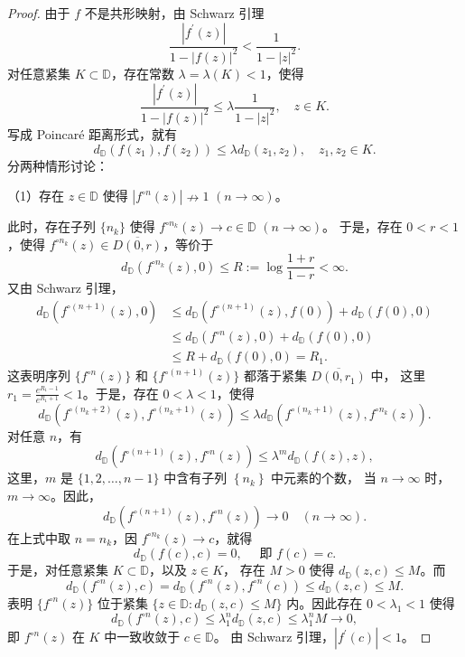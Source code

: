 \begin{proof}
由于 $f$ 不是共形映射，由 Schwarz 引理
$$\frac{|f^{\prime}(z)|}{1-|f(z)|^2}<\frac{1}{1-|z|^2}.$$
对任意紧集 $K \subset \mathbb{D}$，存在常数 $\lambda=\lambda(K)<1$，使得
$$\frac{|f^{\prime}(z)|}{1-|f(z)|^2} \leq \lambda \frac{1}{1-|z|^2}, \quad z \in K.$$
写成 Poincaré 距离形式，就有
$$d_{\mathbb{D}}(f(z_1), f(z_2)) \leq \lambda d_{\mathbb{D}}(z_1, z_2), \quad z_1, z_2 \in K.$$
分两种情形讨论：

（1）存在 $z \in \mathbb{D}$ 使得 $|f^{\circ n}(z)| \nrightarrow 1$ $(n \rightarrow \infty)$。

此时，存在子列 $\{n_k\}$ 使得 $f^{\circ n_k}(z) \rightarrow c \in \mathbb{D}$ $(n \rightarrow \infty)$。
于是，存在 $0<r<1$，使得 $f^{\circ n_k}(z) \in \overline{D(0, r)}$，等价于
\[d_{\mathbb{D}}\left(f^{\circ n_k}(z), 0\right) \leq R:=\log \frac{1+r}{1-r}<\infty.\]
又由 Schwarz 引理，
\begin{align*}
d_{\mathbb{D}}(f^{\circ(n+1)}(z), 0) & \leq d_{\mathbb{D}}(f^{\circ(n+1)}(z), f(0))+d_{\mathbb{D}}(f(0), 0) \\
& \leq d_{\mathbb{D}}(f^{\circ n}(z), 0)+d_{\mathbb{D}}(f(0), 0) \\
& \leq R+d_{\mathbb{D}}(f(0), 0)=R_1.
\end{align*}
这表明序列 $\{f^{\circ n}(z)\}$ 和 $\{f^{\circ(n+1)}(z)\}$ 都落于紧集 $\overline{D(0, r_1)}$ 中，
这里 $r_1=\frac{e^{R_1-1}}{e^{R_1+1}}<1$。于是，存在 $0<\lambda<1$，使得
$$d_{\mathbb{D}}(f^{\circ(n_k+2)}(z), f^{\circ(n_k+1)}(z)) 
\leq \lambda d_{\mathbb{D}}(f^{\circ(n_k+1)}(z), f^{\circ n_k}(z)).$$
对任意 $n$，有
$$d_{\mathbb{D}}(f^{\circ(n+1)}(z), f^{\circ n}(z)) 
\leq \lambda^m d_{\mathbb{D}}(f(z), z),$$
这里，$m$ 是 $\{1,2, \ldots, n-1\}$ 中含有子列 $\left\{n_k\right\}$ 中元素的个数，
当 $n \rightarrow \infty$ 时，$m \rightarrow \infty$。因此，
$$d_{\mathbb{D}}(f^{\circ(n+1)}(z), f^{\circ n}(z)) \rightarrow 0 \quad(n \rightarrow \infty).$$
在上式中取 $n=n_k$，因 $f^{\circ n_k}(z) \rightarrow c$，就得
$$d_{\mathbb{D}}(f(c), c)=0, \quad \text { 即 } f(c)=c.$$
于是，对任意紧集 $K \subset \mathbb{D}$，以及 $z \in K$，
存在 $M>0$ 使得 $d_{\mathbb{D}}(z, c) \leq M$。而
\[d_{\mathbb{D}}(f^{\circ n}(z), c)
=d_{\mathbb{D}}(f^{\circ n}(z), f^{\circ n}(c)) 
\leq d_{\mathbb{D}}(z, c) \leq M.\]
表明 $\{f^{\circ n}(z)\}$ 位于紧集 $\{z \in \mathbb{D}: d_{\mathbb{D}}(z, c) \leq M\}$ 内。因此存在 $0<\lambda_1<1$ 使得
$$d_{\mathbb{D}}(f^{\circ n}(z), c) 
\leq \lambda_1^n d_{\mathbb{D}}(z, c) \leq \lambda_1^n M \rightarrow 0,$$
即 $f^{\circ n}(z)$ 在 $K$ 中一致收敛于 $c \in \mathbb{D}$。
由 Schwarz 引理，$|f^{\prime}(c)|<1$。


\end{proof}
